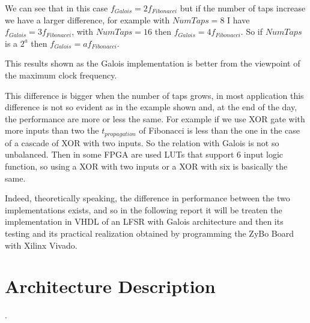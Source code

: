 \documentclass[a4paper]{report}
\begin{document}
\noindent We can see that in this case $f_{Galois}=2f_{Fibonacci}$ but if the number of taps increase we have a larger difference, for example with $NumTaps = 8$ I have $f_{Galois} = 3f_{Fibonacci}$, with $NumTaps=16$ then $f_{Galois} = 4f_{Fibonacci}$. So if $NumTaps$ is a $2^a$ then $f_{Galois} = af_{Fibonacci}$.

\noindent This results shown as the Galois implementation is better from the viewpoint of the maximum clock frequency.

\noindent This difference is bigger when the number of taps grows, in most application this difference is not so evident as in the example shown and, at the end of the day, the performance are more or less the same. For example if we use XOR gate with more inputs than two the $t_{propagation}$ of Fibonacci is less than the one in the case of a cascade of XOR with two inputs. So the relation with Galois is not so unbalanced. Then in some FPGA are used LUTs that support 6 input logic function, so using a XOR with two inputs or a XOR with six is basically the same.

\noindent Indeed, theoretically speaking, the difference in performance between the two implementations exists, and so in the following report it will be treaten the implementation in VHDL of an LFSR with Galois architecture and then its testing and its practical realization obtained by programming the ZyBo Board with Xilinx Vivado. 

\chapter{Architecture Description}
.
\end{document}
